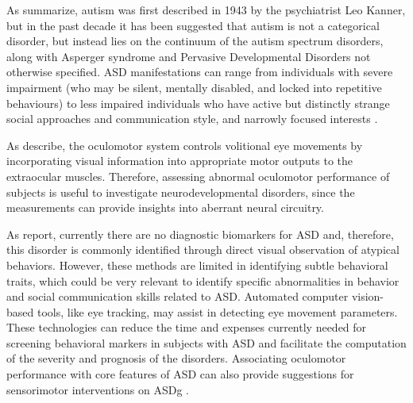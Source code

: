As \cite{boraston2007eyetrackingASD} summarize, autism was first described in 1943 by the psychiatrist Leo Kanner, but in the past decade it has been suggested that autism is not a categorical disorder, but instead lies on the continuum of the autism spectrum disorders, along with Asperger syndrome and Pervasive Developmental Disorders not otherwise specified.
ASD manifestations can range from individuals with severe impairment (who may be silent, mentally disabled, and locked into repetitive behaviours) to less impaired individuals who have active but distinctly strange social approaches and communication style, and narrowly focused interests \citep{pensiero2009saccades}.

As \cite{wilkes2015oculomotor} describe, the oculomotor system controls volitional eye movements by incorporating visual information into appropriate motor outputs to the extraocular muscles. Therefore, assessing abnormal oculomotor performance of subjects is useful to investigate neurodevelopmental disorders, since the measurements can provide insights into aberrant neural circuitry.

As \cite{samad2017markers} report, currently there are no diagnostic biomarkers for ASD and, therefore, this disorder is commonly identified through direct visual observation of atypical behaviors. However,  these methods are limited in identifying subtle behavioral traits, which could be very relevant to identify specific abnormalities in behavior and social communication skills related to ASD. Automated computer vision-based tools, like eye tracking, may assist in detecting eye movement parameters. These technologies can reduce the time and expenses currently needed for screening behavioral markers in subjects with ASD and facilitate the computation of the severity and prognosis of the disorders. Associating oculomotor performance with core features of ASD can also provide suggestions for sensorimotor interventions on ASDg \citep{wilkes2015oculomotor}.

